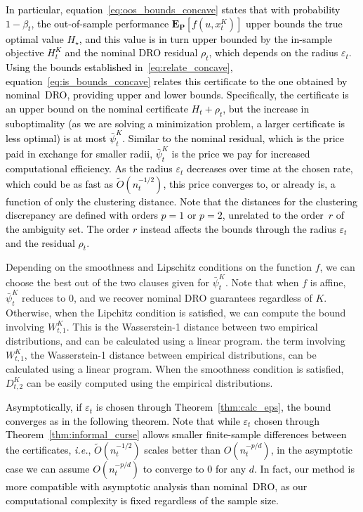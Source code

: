 \documentclass[12pt]{article}
\newcommand{\ie}{{\it i.e.}}
\newcommand{\unc}{u}
\newcommand{\epsnom}{\varepsilon}
\newcommand{\barp}{p}
\newcommand{\ld}{W}
\newcommand{\RC}[1]{\textcolor{black}{#1}}
\newcommand{\RC}[1]{\textcolor{blue}{#1}}
\begin{document}
\RC{In particular, equation~\eqref{eq:oos_bounds_concave} states that with probability $1-\beta_{t}$, the out-of-sample performance $\mathbf{E}_{\mathbf{P}}[f(\unc, x^K_{t})]$ upper bounds the true optimal value $H_\star$, and this value is in turn upper bounded by the in-sample objective $H^K_t$ and the nominal DRO residual $\rho_{t}$, which depends on the radius $\epsnom_t$. 
Using the bounds established in~\eqref{eq:relate_concave}, equation~\eqref{eq:is_bounds_concave} relates this certificate to the one obtained by nominal~\gls{DRO}, providing upper and lower bounds. 
Specifically, the certificate is an upper bound on the nominal certificate $H_t +\rho_{t}$, but the increase in suboptimality \ifpreprint(as we are solving a minimization problem, a larger certificate is less optimal) \fi is at most $\bar{\psi}_t^K$. Similar to the nominal residual, which is the price paid in exchange for smaller radii, $\bar{\psi}_t^K$ is the price we pay for increased computational efficiency.}
\RC{As the radius $\epsnom_t$ decreases over time at the chosen rate, which could be as fast as $\tilde{O}(n_t^{-1/2})$, this price converges to, or already is, a function of only the clustering distance.}
\RC{Note that the distances for the clustering discrepancy are defined with orders $\barp=1$ or $\barp=2$, unrelated to the order~$r$ of the ambiguity set. The order $r$ instead affects the bounds through the radius $\epsnom_t$ and the residual $\rho_t$.}

Depending on the smoothness and Lipschitz conditions on the function $f$, we can choose the best out of the two clauses given for $\bar{\psi}_t^K$. Note that when $f$ is affine, $\bar{\psi}_t^K$ reduces to $0$, and we recover nominal \gls{DRO} guarantees regardless of $K$. 
Otherwise, when the Lipchitz condition is satisfied, \ifpreprint we can compute the bound involving $\ld^K_{t,1}$. This is the Wasserstein-1 distance between two empirical distributions, and can be calculated using a linear program. \else 
the term involving $\ld^K_{t,1}$, the Wasserstein-1 distance between empirical distributions, can be calculated using a linear program. \fi
When the smoothness condition is satisfied, $D_{t,2}^K$ can be easily computed using the empirical distributions.

\RC{Asymptotically, if $\epsnom_t$ is chosen through Theorem~\ref{thm:calc_eps}, the bound converges as in the following theorem. Note that while $\epsnom_t$ chosen through Theorem~\ref{thm:informal_curse} allows smaller finite-sample differences between the certificates, \ie, $\tilde{O}(n_t^{-1/2})$ scales better than $O(n_t^{-p/d})$, in the asymptotic case we can assume $O(n_t^{-p/d})$ to converge to 0 for any $d$. In fact, our method is more compatible with asymptotic analysis than nominal~\gls{DRO}, as our computational complexity is fixed regardless of the sample size.}
\end{document}
